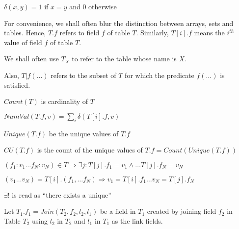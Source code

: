 \begin{definition}
\(\delta(x, y)  = 1 \) if \(x = y\) and 0 otherwise
\end{definition}

\begin{notation}
For convenience, we shall often blur the distinction between arrays,
sets and tables.  Hence, \(T.f\) refers to field \(f\) of table
\(T\). Similarly, \(T[i].  f\) means the \(i^{th}\) value of field
\(f\) of table \(T\).  
\end{notation}

\begin{notation}
We shall often use \(T_X\) to refer to the table whose name is \(X\).
\end{notation}

\begin{notation}
Also, \(T|f(\ldots)\) refers to the subset of
\(T\) for which the predicate \(f(\ldots)\) is satisfied.
\end{notation}

\begin{notation}
\(Count(T)\) is cardinality of \(T\)
\end{notation}

\begin{notation}
\label{NumNN}
\(NumVal(T.f, v) = \sum_i \delta (T[i].f, v)\)
\end{notation}

\begin{notation}
\(Unique(T.f)\) be the unique values of \(T.f\)
\end{notation}

\begin{notation}
\(CU(T.f)\) is the count of the unique values of \(T.f =
Count(Unique(T.f))\)
\end{notation}

\begin{notation}
\((f_1:v_1 \ldots f_N:v_N) \in T \Rightarrow 
\exists j: T[j].f_1 = v_1 \wedge \ldots T[j].f_N = v_N \)
\end{notation}

\begin{notation}
\((v_1 \ldots v_N) = T[i].(f_1,\ldots f_N) \Rightarrow 
v_1 = T[i].f_1 \ldots v_N = T[j].f_N\)
\end{notation}

\begin{notation}
\(\exists ! \) is read as ``there exists a unique''
\end{notation}


\begin{definition}
Let \(T_1.f_1 = Join (T_2, f_2, l_2, l_1)\) be a field in \(T_1\)
  created by joining field \(f_2\) in Table \(T_2\) using \(l_2\) in
  \(T_2\) and \(l_1\) in \(T_1\) as the link fields.
\end{definition}
